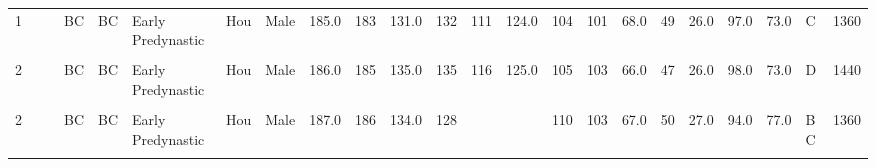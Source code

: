 \begin{table}[p]
{\begin{tabular}{rrrlllllrrrrrrrrrrrrrlr}
1 &  &  & BC & BC & Early Predynastic & Hou & Male & 185.0 & 183 & 131.0 & 132 & 111 & 124.0 & 104 & 101 & 68.0 & 49 & 26.0 & 97.0 & 73.0 & C & 1360\\
\addlinespace
\cellcolor{gray!10}{1} & \cellcolor{gray!10}{} & \cellcolor{gray!10}{} & \cellcolor{gray!10}{BC} & \cellcolor{gray!10}{BC} & \cellcolor{gray!10}{Early Predynastic} & \cellcolor{gray!10}{Hou} & \cellcolor{gray!10}{Male} & \cellcolor{gray!10}{184.0} & \cellcolor{gray!10}{184} & \cellcolor{gray!10}{133.0} & \cellcolor{gray!10}{126} & \cellcolor{gray!10}{114} & \cellcolor{gray!10}{125.0} & \cellcolor{gray!10}{103} & \cellcolor{gray!10}{102} & \cellcolor{gray!10}{66.0} & \cellcolor{gray!10}{51} & \cellcolor{gray!10}{28.0} & \cellcolor{gray!10}{99.0} & \cellcolor{gray!10}{72.0} & \cellcolor{gray!10}{D} & \cellcolor{gray!10}{1310}\\
2 &  &  & BC & BC & Early Predynastic & Hou & Male & 186.0 & 185 & 135.0 & 135 & 116 & 125.0 & 105 & 103 & 66.0 & 47 & 26.0 & 98.0 & 73.0 & D & 1440\\
\cellcolor{gray!10}{2} & \cellcolor{gray!10}{} & \cellcolor{gray!10}{} & \cellcolor{gray!10}{BC} & \cellcolor{gray!10}{BC} & \cellcolor{gray!10}{Early Predynastic} & \cellcolor{gray!10}{Hou} & \cellcolor{gray!10}{Male} & \cellcolor{gray!10}{176.0} & \cellcolor{gray!10}{175} & \cellcolor{gray!10}{124.0} & \cellcolor{gray!10}{134} & \cellcolor{gray!10}{110} & \cellcolor{gray!10}{123.0} & \cellcolor{gray!10}{96} & \cellcolor{gray!10}{93} & \cellcolor{gray!10}{74.0} & \cellcolor{gray!10}{53} & \cellcolor{gray!10}{23.0} & \cellcolor{gray!10}{97.0} & \cellcolor{gray!10}{69.0} & \cellcolor{gray!10}{A B} & \cellcolor{gray!10}{1245}\\
2 &  &  & BC & BC & Early Predynastic & Hou & Male & 187.0 & 186 & 134.0 & 128 &  &  & 110 & 103 & 67.0 & 50 & 27.0 & 94.0 & 77.0 & B C & 1360\\
\cellcolor{gray!10}{2} & \cellcolor{gray!10}{} & \cellcolor{gray!10}{} & \cellcolor{gray!10}{BC} & \cellcolor{gray!10}{BC} & \cellcolor{gray!10}{Early Predynastic} & \cellcolor{gray!10}{Hou} & \cellcolor{gray!10}{Male} & \cellcolor{gray!10}{181.0} & \cellcolor{gray!10}{181} & \cellcolor{gray!10}{130.0} & \cellcolor{gray!10}{130} & \cellcolor{gray!10}{117} & \cellcolor{gray!10}{129.0} & \cellcolor{gray!10}{103} & \cellcolor{gray!10}{104} & \cellcolor{gray!10}{69.0} & \cellcolor{gray!10}{49} & \cellcolor{gray!10}{25.0} & \cellcolor{gray!10}{101.0} & \cellcolor{gray!10}{69.5} & \cellcolor{gray!10}{D E} & \cellcolor{gray!10}{1300}\\

\end{tabular}}
\end{table}
